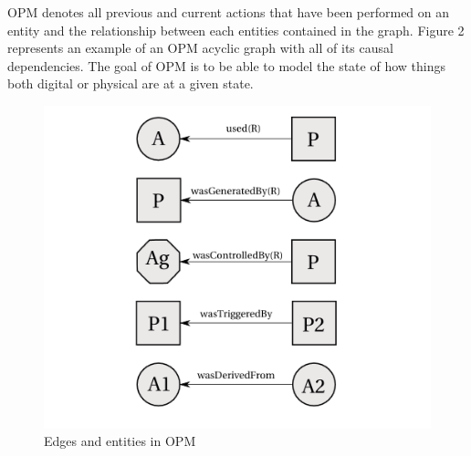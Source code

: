 OPM denotes all previous and current actions that have been performed on an entity and  the relationship between each entities contained in the graph. Figure 2 represents an example of an OPM acyclic graph with all of its causal dependencies. The goal of OPM is to be able to model the state of how things both digital or physical are at a given state.   

\begin{figure}[h]
\begin{center}

\includegraphics{opm_convention.PNG}
\end{center}
\caption{Edges and entities in OPM}
\label{autom}
\end{figure}


